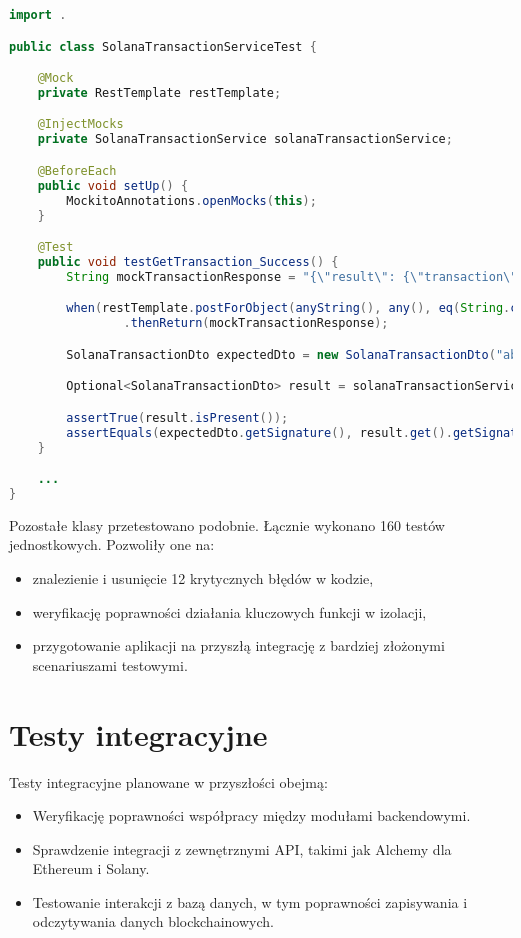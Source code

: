 \begin{lstlisting}[language=Java, style=JavaStyle]
import .

public class SolanaTransactionServiceTest {

    @Mock
    private RestTemplate restTemplate;

    @InjectMocks
    private SolanaTransactionService solanaTransactionService;

    @BeforeEach
    public void setUp() {
        MockitoAnnotations.openMocks(this);
    }

    @Test
    public void testGetTransaction_Success() {
        String mockTransactionResponse = "{\"result\": {\"transaction\": {\"signature\": \"...\"}}}";

        when(restTemplate.postForObject(anyString(), any(), eq(String.class)))
                .thenReturn(mockTransactionResponse);

        SolanaTransactionDto expectedDto = new SolanaTransactionDto("abcd1234");

        Optional<SolanaTransactionDto> result = solanaTransactionService.getTransaction("...");

        assertTrue(result.isPresent());
        assertEquals(expectedDto.getSignature(), result.get().getSignature());
    }

    ...
}
\end{lstlisting}

Pozostałe klasy przetestowano podobnie. Łącznie wykonano 160 testów jednostkowych. %
Pozwoliły one na:
\begin{itemize}
    \item znalezienie i usunięcie 12 krytycznych błędów w kodzie,
    \item weryfikację poprawności działania kluczowych funkcji w izolacji,
    \item przygotowanie aplikacji na przyszłą integrację z bardziej złożonymi scenariuszami testowymi.
\end{itemize}

\section{Testy integracyjne}
Testy integracyjne planowane w przyszłości obejmą:
\begin{itemize}
    \item Weryfikację poprawności współpracy między modułami backendowymi.
    \item Sprawdzenie integracji z zewnętrznymi API, takimi jak Alchemy dla Ethereum i Solany.
    \item Testowanie interakcji z bazą danych, w tym poprawności zapisywania i odczytywania danych blockchainowych.
\end{itemize}
